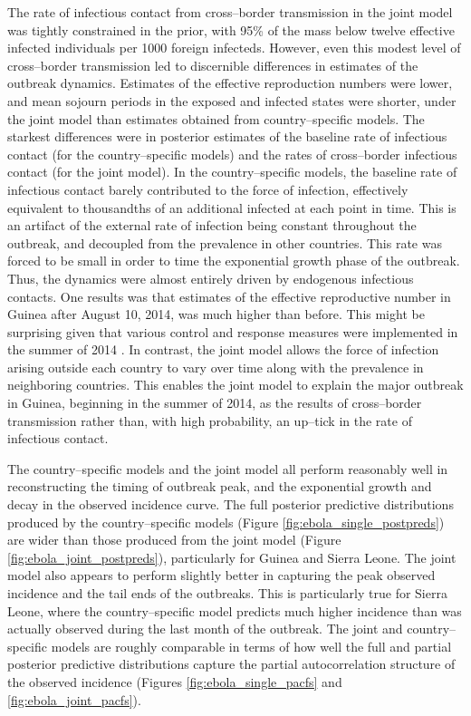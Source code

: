 The rate of infectious contact from cross--border transmission in the joint model was tightly constrained in the prior, with 95\% of the mass below twelve effective infected individuals per 1000 foreign infecteds. However, even this modest level of cross--border transmission led to discernible differences in estimates of the outbreak dynamics. Estimates of the effective reproduction numbers were lower, and mean sojourn periods in the exposed and infected states were shorter, under the joint model than estimates obtained from country--specific models. The starkest differences were in posterior estimates of the baseline rate of infectious contact (for the country--specific models) and the rates of cross--border infectious contact (for the joint model). In the country--specific models, the baseline rate of infectious contact barely contributed to the force of infection, effectively equivalent to thousandths of an additional infected at each point in time. This is an artifact of the external rate of infection being constant throughout the outbreak, and decoupled from the prevalence in other countries. This rate was forced to be small in order to time the exponential growth phase of the outbreak. Thus, the dynamics were almost entirely driven by endogenous infectious contacts. One results was that estimates of the effective reproductive number in Guinea after August 10, 2014, was much higher than before. This might be surprising given that various control and response measures were implemented in the summer of 2014 \cite{coltart2017ebola}. In contrast, the joint model allows the force of infection arising outside each country to vary over time along with the prevalence in neighboring countries. This enables the joint model to explain the major outbreak in Guinea, beginning in the summer of 2014, as the results of cross--border transmission rather than, with high probability, an up--tick in the rate of infectious contact.

The country--specific models and the joint model all perform reasonably well in reconstructing the timing of outbreak peak, and the exponential growth and decay in the observed incidence curve. The full posterior predictive distributions produced by the country--specific models (Figure \ref{fig:ebola_single_postpreds}) are wider than those produced from the joint model (Figure \ref{fig:ebola_joint_postpreds}), particularly for Guinea and Sierra Leone. The joint model also appears to perform slightly better in capturing the peak observed incidence and the tail ends of the outbreaks. This is particularly true for Sierra Leone, where the country--specific model predicts much higher incidence than was actually observed during the last month of the outbreak. The joint and country--specific models are roughly comparable in terms of how well the full and partial posterior predictive distributions capture the partial autocorrelation structure of the observed incidence (Figures \ref{fig:ebola_single_pacfs} and \ref{fig:ebola_joint_pacfs}).

